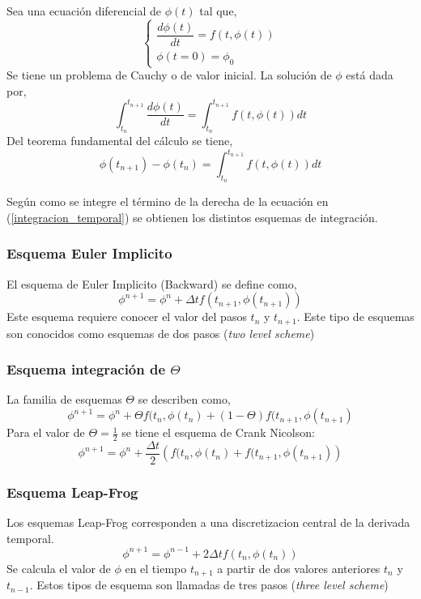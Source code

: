 Sea una ecuación diferencial de $\phi(t)$ tal que,
\begin{equation}
\left\{
\begin{matrix}
\dfrac{d \phi(t)}{dt} = f(t,\phi(t)) \\
\phi(t=0) = \phi_0
\end{matrix}
\right.
\end{equation}
Se tiene un problema de Cauchy o de valor inicial. La solución de $\phi$ está dada por,
\begin{equation}
\int_{t_n}^{t_{n+1}} \dfrac{d \phi(t)}{dt} = \int_{t_n}^{t_{n+1}} f(t,\phi(t)) dt
\end{equation}
Del teorema fundamental del cálculo se tiene,
\begin{equation} \label{integracion_temporal}
\phi(t_{n+1}) - \phi({t_n})  = \int_{t_n}^{t_{n+1}}  f(t,\phi(t)) dt
\end{equation}

Según como se integre el término de la derecha de la ecuación en (\ref{integracion_temporal}) se obtienen los distintos esquemas de integración. 

\subsubsection{Esquema Euler Implicito}
El esquema de Euler Implicito (Backward) se define como,
\begin{equation}
\phi^{n+1} = \phi^n + \Delta t f(t_{n+1},\phi(t_{n+1}))
\end{equation}
Este esquema requiere conocer el valor del pasos $t_{n}$ y $t_{n+1}$. Este tipo de esquemas son conocidos como esquemas de dos pasos (\textit{two level scheme})

\subsubsection{Esquema integración de $\Theta$}
La familia de esquemas $\Theta$ se describen como,
\begin{equation}
\phi^{n+1} = \phi^n + \Theta f(t_{n},\phi(t_{n}) + (1-\Theta) f(t_{n+1},\phi(t_{n+1})
\end{equation}
Para el valor de $\Theta = \frac{1}{2}$ se tiene el esquema de Crank Nicolson:
\begin{equation}
\phi^{n+1} = \phi^n + \dfrac{\Delta t}{2} \left( f(t_{n},\phi(t_{n}) + f(t_{n+1},\phi(t_{n+1}) \right)
\end{equation}

\subsubsection{Esquema Leap-Frog}
Los esquemas Leap-Frog corresponden a una discretizacion central de la derivada temporal.
\begin{equation}
\phi^{n+1} = \phi^{n-1} + 2 \Delta t f(t_n,\phi(t_n))
\end{equation}
Se calcula el valor de $\phi$ en el tiempo $t_{n+1}$ a partir de dos valores anteriores $t_n$ y $t_{n-1}$. Estos tipos de esquema son llamadas de tres pasos (\textit{three level scheme})

